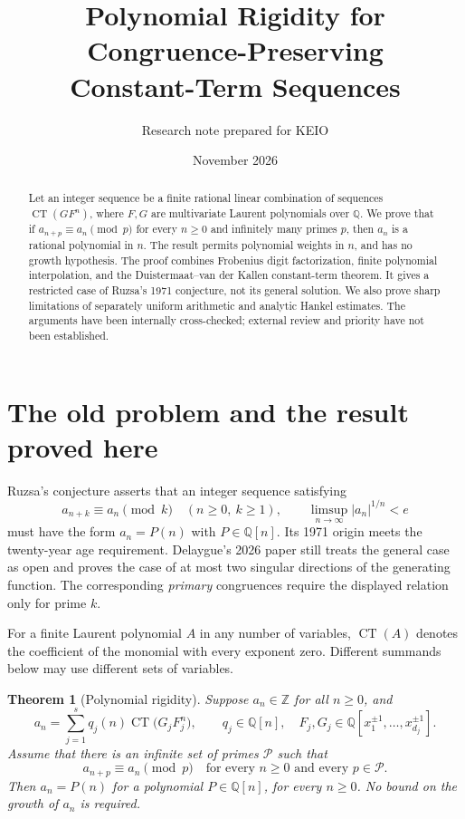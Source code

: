 \documentclass[11pt,a4paper]{article}
\title{Polynomial Rigidity for Congruence-Preserving\\Constant-Term Sequences}
\author{Research note prepared for KEIO}
\date{November 2026}
\newtheorem{theorem}{Theorem}[section]
\theoremstyle{remark}\newtheorem{remark}[theorem]{Remark}
\newcommand{\Q}{\mathbb Q}\newcommand{\Z}{\mathbb Z}
\newcommand{\CT}{\operatorname{CT}}
\begin{document}
\maketitle
\begin{abstract}
Let an integer sequence be a finite rational linear combination of sequences
$\CT(GF^n)$, where $F,G$ are multivariate Laurent polynomials over $\Q$.
We prove that if $a_{n+p}\equiv a_n\pmod p$ for every $n\ge0$ and infinitely
many primes $p$, then $a_n$ is a rational polynomial in $n$.
The result permits polynomial weights in $n$, and has no growth hypothesis.
The proof combines Frobenius digit factorization, finite polynomial
interpolation, and the Duistermaat--van der Kallen constant-term theorem.
It gives a restricted case of Ruzsa's 1971 conjecture, not its general solution.
We also prove sharp limitations of separately uniform arithmetic and analytic
Hankel estimates. The arguments have been internally cross-checked; external
review and priority have not been established.
\end{abstract}

\section{The old problem and the result proved here}

Ruzsa's conjecture \cite{Ruzsa,Delaygue} asserts that an integer sequence
satisfying
\[
 a_{n+k}\equiv a_n\pmod k\quad(n\ge0,\ k\ge1),\qquad
 \limsup_{n\to\infty}|a_n|^{1/n}<e
\]
must have the form $a_n=P(n)$ with $P\in\Q[n]$.
Its 1971 origin meets the twenty-year age requirement. Delaygue's 2026 paper
still treats the general case as open and proves the case of at most two
singular directions of the generating function. The corresponding
\emph{primary} congruences require the displayed relation only for prime $k$.

For a finite Laurent polynomial $A$ in any number of variables, $\CT(A)$
denotes the coefficient of the monomial with every exponent zero.
Different summands below may use different sets of variables.

\begin{theorem}[Polynomial rigidity]\label{thm:main}
Suppose $a_n\in\Z$ for all $n\ge0$, and
\begin{equation}\label{eq:representation}
 a_n=\sum_{j=1}^s q_j(n)\CT\bigl(G_j F_j^n\bigr),
 \qquad q_j\in\Q[n],\quad
 F_j,G_j\in\Q[x_1^{\pm1},\ldots,x_{d_j}^{\pm1}].
\end{equation}
Assume that there is an infinite set of primes $\mathcal P$ such that
\begin{equation}\label{eq:period}
 a_{n+p}\equiv a_n\pmod p
 \quad\text{for every }n\ge0\text{ and every }p\in\mathcal P.
\end{equation}
Then $a_n=P(n)$ for a polynomial $P\in\Q[n]$, for every $n\ge0$.
No bound on the growth of $a_n$ is required.
\end{theorem}
\end{document}
